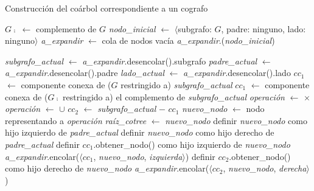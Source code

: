 \bigskip
\begin{algorithm}[H]
    \SetAlgoVlined
    \caption{Construcción del coárbol correspondiente a un cografo}
    \label{alg:ex3:coarbol}

    $G\comp$ $\gets$ complemento de $G$ \;
    \textit{nodo\_inicial} $\gets$
    $\langle$subgrafo: $G$, padre: \textsf{ninguno}, lado: \textsf{ninguno}$\rangle$ \;
    \textit{a\_expandir} $\gets$ cola de nodos vacía \;
    \textit{a\_expandir}.(\textit{nodo\_inicial}) \;

     {
        \textit{subgrafo\_actual} $\gets$ \textit{a\_expandir}.desencolar().subgrafo \;
        \textit{padre\_actual} $\gets$ \textit{a\_expandir}.desencolar().padre \;
        \textit{lado\_actual} $\gets$ \textit{a\_expandir}.desencolar().lado \;
        $cc_1$ $\gets$ componente conexa de ($G$ restringido a) \textit{subgrafo\_actual} \;
         {
            $cc_1$ $\gets$ componente conexa de ($G\comp$ restringido a) el complemento de \textit{subgrafo\_actual} \;
            \textit{operación} $\gets$ $\times$ \;
        } {
            \textit{operación} $\gets$ $\cup$ \;
        }
        $cc_2$ $\gets$ \textit{subgrafo\_actual} $-$ $cc_1$ \;
        \textit{nuevo\_nodo} $\gets$ nodo representando a \textit{operación} \;
         {
            \textit{raíz\_cotree} $\gets$ \textit{nuevo\_nodo} \;
        } {
             {
                definir \textit{nuevo\_nodo} como hijo izquierdo de \textit{padre\_actual} \;
            } {
                definir \textit{nuevo\_nodo} como hijo derecho de \textit{padre\_actual} \;
            }
        }
         {
            definir $cc_1$.obtener\_nodo() como hijo izquierdo de \textit{nuevo\_nodo} \;
        } {
            \textit{a\_expandir}.encolar($\langle cc_1$, \textit{nuevo\_nodo}, \textit{izquierda}$\rangle$) \;
        }
         {
            definir $cc_2$.obtener\_nodo() como hijo derecho de \textit{nuevo\_nodo} \;
        } {
            \textit{a\_expandir}.encolar($\langle cc_2$, \textit{nuevo\_nodo}, \textit{derecha}$\rangle$) \;
        }
    }
\end{algorithm}
\bigskip

